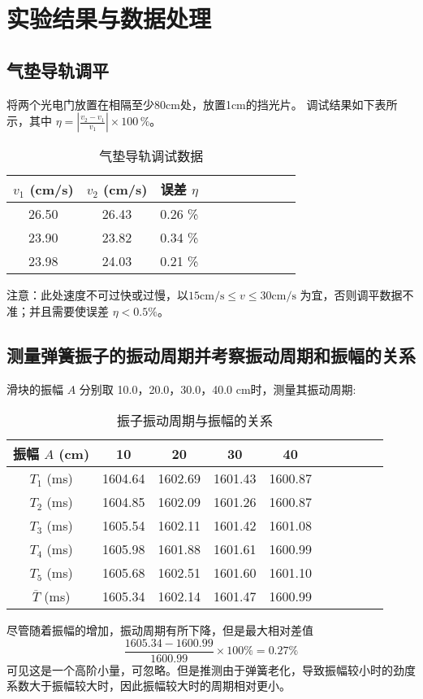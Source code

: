 \documentclass[11pt]{article}
\begin{document}
\section{实验结果与数据处理}

	\subsection{气垫导轨调平}
	将两个光电门放置在相隔至少80cm处，放置1cm的挡光片。\newline
	\indent 调试结果如下表所示，其中 $\eta =| \frac{v_2 - v_1}{v_1} | \times 100 \,\%$。
	\begin{table}[H]\centering
		\caption{气垫导轨调试数据}
		\label{tab: 气垫导轨调试数据}
		\begin{tabular}{cccccccccc}\toprule
			$v_1$ (cm/s)& $v_2$ (cm/s)& 误差 $\eta$ \\ 
			\midrule
			26.50	&26.43	&0.26 \% \\
			23.90	&23.82	&0.34 \% \\
			23.98	&24.03	&0.21 \% \\
			\bottomrule
		\end{tabular}
	\end{table}
	注意：此处速度不可过快或过慢，以$15\mathrm{cm/s} \leq v \leq 30\mathrm{cm/s}$ 为宜，否则调平数据不准；并且需要使误差 $\eta < 0.5 \% $。
	
	\subsection{测量弹簧振子的振动周期并考察振动周期和振幅的关系}
	
    滑块的振幅 $A$ 分别取 10.0，20.0，30.0，40.0 cm时，测量其振动周期:
	\begin{table}[H]\centering
		\caption{振子振动周期与振幅的关系}
		\label{振子振动周期与振幅的关系}
		\begin{tabular}{cccccccccc}\toprule
			振幅 $A$ (cm) & 10 & 20 & 30 & 40  \\
			\midrule
			$T_1$ (ms) &1604.64	&1602.69	&1601.43	&1600.87 \\
			$T_2$ (ms) &1604.85	&1602.09	&1601.26	&1600.87 \\
			$T_3$ (ms) &1605.54	&1602.11	&1601.42	&1601.08 \\
			$T_4$ (ms) &1605.98	&1601.88	&1601.61	&1600.99 \\
			$T_5$ (ms) &1605.68	&1602.51	&1601.60	&1601.10 \\
			$\overline{T}$ (ms) &1605.34	&1602.14	&1601.47	&1600.99 \\
			\bottomrule
		\end{tabular}
	\end{table}
	尽管随着振幅的增加，振动周期有所下降，但是最大相对差值\[\frac{1605.34-1600.99}{1600.99} \times 100\% =0.27 \%\]可见这是一个高阶小量，可忽略。但是推测由于弹簧老化，导致振幅较小时的劲度系数大于振幅较大时，因此振幅较大时的周期相对更小。
	
\end{document}
